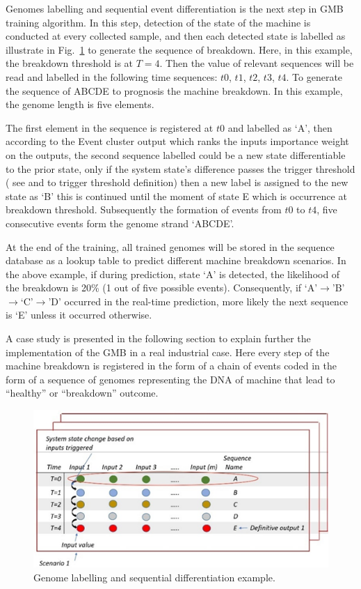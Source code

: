 \documentclass[conference]{IEEEtran}
\begin{document}
Genomes labelling and sequential event differentiation is  the next step in GMB training algorithm. In this step, detection of the state of the machine is conducted at every collected sample, and then each detected state is labelled as illustrate in Fig.~\ref{fig:Genome_labelling} to generate the sequence of breakdown. Here, in this example, the breakdown threshold is at $T=4$. Then the value of relevant sequences will be read and labelled in the following time sequences:  $t0$, $t1$, $t2$, $t3$, $t4$. To generate the sequence of ABCDE to prognosis the machine breakdown. In this example, the genome length is five elements.

The first element in the sequence is registered at $t0$   and labelled as ‘A’, then according to the Event cluster output \cite{Kumar2019} which ranks the inputs importance weight on the outputs, the second sequence labelled could be a new state differentiable to the prior state, only if the system state’s difference passes the trigger threshold ( see \cite{Danishvar2018} and \cite{Tavakoli2013} to trigger threshold definition) then a new label is assigned to the new state as ‘B’ this is continued until the moment of state E which is occurrence at breakdown threshold. Subsequently the formation of events from $t0$ to $t4$, five consecutive events form the genome strand ‘ABCDE’.

At the end of the training, all trained genomes will be stored in the sequence database as a lookup table to predict different machine breakdown scenarios. In the above example, if during prediction, state ‘A’ is detected, the likelihood of the breakdown is 20\% (1 out of five possible events). Consequently, if ‘A’$\to$’B’$\to$‘C’$\to$’D’ occurred in the real-time prediction, more likely the next sequence is ‘E’ unless it occurred otherwise. 

A case study is presented in the following section to explain further the implementation of the GMB in a real industrial case. Here every step of the machine breakdown is registered in the form of a chain of events coded in the form of a sequence of genomes representing the DNA of machine that lead to “healthy” or “breakdown” outcome.
\begin{figure}[tbp]
\centerline{\includegraphics[width=\linewidth]{Genome_Labelling.png}}
\caption{Genome labelling and sequential differentiation example.}
\label{fig:Genome_labelling}
\end{figure}
\end{document}
